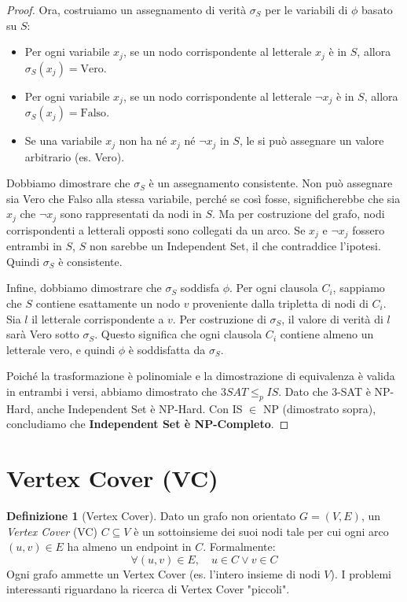 \documentclass[a4paper]{article}
\theoremstyle{definition} %
\newtheorem{definition}{Definizione}[section]
\theoremstyle{definition} %
\begin{document}
\begin{proof}
Ora, costruiamo un assegnamento di verità $\sigma_S$ per le variabili di $\phi$ basato su $S$:
\begin{itemize}
    \item Per ogni variabile $x_j$, se un nodo corrispondente al letterale $x_j$ è in $S$, allora $\sigma_S(x_j) = \text{Vero}$.
    \item Per ogni variabile $x_j$, se un nodo corrispondente al letterale $\neg x_j$ è in $S$, allora $\sigma_S(x_j) = \text{Falso}$.
    \item Se una variabile $x_j$ non ha né $x_j$ né $\neg x_j$ in $S$, le si può assegnare un valore arbitrario (es. Vero).
\end{itemize}
Dobbiamo dimostrare che $\sigma_S$ è un assegnamento consistente. Non può assegnare sia Vero che Falso alla stessa variabile, perché se così fosse, significherebbe che sia $x_j$ che $\neg x_j$ sono rappresentati da nodi in $S$. Ma per costruzione del grafo, nodi corrispondenti a letterali opposti sono collegati da un arco. Se $x_j$ e $\neg x_j$ fossero entrambi in $S$, $S$ non sarebbe un Independent Set, il che contraddice l'ipotesi. Quindi $\sigma_S$ è consistente.

Infine, dobbiamo dimostrare che $\sigma_S$ soddisfa $\phi$.
Per ogni clausola $C_i$, sappiamo che $S$ contiene esattamente un nodo $v$ proveniente dalla tripletta di nodi di $C_i$. Sia $l$ il letterale corrispondente a $v$. Per costruzione di $\sigma_S$, il valore di verità di $l$ sarà Vero sotto $\sigma_S$. Questo significa che ogni clausola $C_i$ contiene almeno un letterale vero, e quindi $\phi$ è soddisfatta da $\sigma_S$.

Poiché la trasformazione è polinomiale e la dimostrazione di equivalenza è valida in entrambi i versi, abbiamo dimostrato che $3SAT \le_p IS$. Dato che 3-SAT è NP-Hard, anche Independent Set è NP-Hard. Con IS $\in$ NP (dimostrato sopra), concludiamo che \textbf{Independent Set è NP-Completo}.
\end{proof}

\section{Vertex Cover (VC)}

\begin{definition}[Vertex Cover]
Dato un grafo non orientato $G=(V, E)$, un \emph{Vertex Cover} (VC) $C \subseteq V$ è un sottoinsieme dei suoi nodi tale per cui ogni arco $(u,v) \in E$ ha almeno un endpoint in $C$. Formalmente:
\[ \forall (u, v) \in E, \quad u \in C \lor v \in C \]
Ogni grafo ammette un Vertex Cover (es. l'intero insieme di nodi $V$). I problemi interessanti riguardano la ricerca di Vertex Cover "piccoli".
\end{definition}
\end{document}
